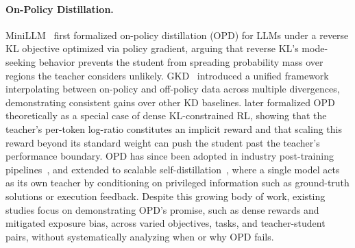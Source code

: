 \paragraph{On-Policy Distillation.}
MiniLLM~\citep{gu2023minillm} first formalized on-policy distillation (OPD) for LLMs under a reverse KL objective optimized via policy gradient, arguing that reverse KL's mode-seeking behavior prevents the student from spreading probability mass over regions the teacher considers unlikely.
GKD~\citep{agarwal2024policy} introduced a unified framework interpolating between on-policy and off-policy data across multiple divergences, demonstrating consistent gains over other KD baselines.
\citet{yang2026learning} later formalized OPD theoretically as a special case of dense KL-constrained RL, showing that the teacher's per-token log-ratio constitutes an implicit reward and that scaling this reward beyond its standard weight can push the student past the teacher's performance boundary.
OPD has since been adopted in industry post-training pipelines~\citep{yang2025qwen3,lu2025onpolicydistillation,zeng2026glm,xiao2026mimo,ko2026scaling,jin2026entropy,jang2026stable, fu2026revisiting,yang2026learning}, and extended to scalable self-distillation~\citep{hubotter2026reinforcement,zhao2026self,he2026far,shenfeld2026self,ye2026policy,sang2026crispcompressedreasoningiterative,kim2026does,ye2026online,yang2026self,li2026unifying,zhao2026selfdistillationmultitokenprediction,ding2026hdpo}, where a single model acts as its own teacher by conditioning on privileged information such as ground-truth solutions or execution feedback.
Despite this growing body of work, existing studies focus on demonstrating OPD's promise, such as dense rewards and mitigated exposure bias, across varied objectives, tasks, and teacher-student pairs, without systematically analyzing when or why OPD fails.


